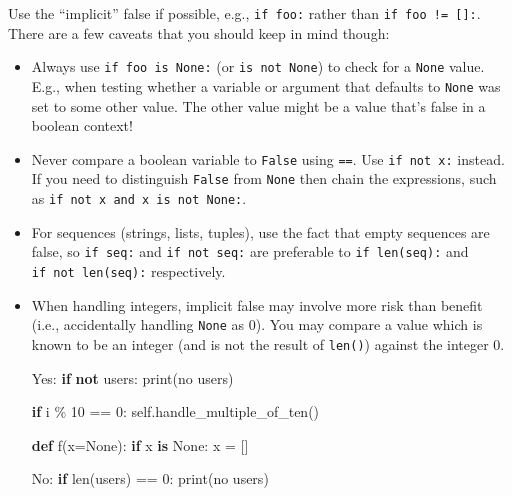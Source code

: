 \documentclass[
]{article}
\newenvironment{Shaded}{}{}
\newcommand{\BuiltInTok}[1]{\textcolor[rgb]{0.00,0.50,0.00}{#1}}
\newcommand{\ControlFlowTok}[1]{\textcolor[rgb]{0.00,0.44,0.13}{\textbf{#1}}}
\newcommand{\DecValTok}[1]{\textcolor[rgb]{0.25,0.63,0.44}{#1}}
\newcommand{\KeywordTok}[1]{\textcolor[rgb]{0.00,0.44,0.13}{\textbf{#1}}}
\newcommand{\NormalTok}[1]{#1}
\newcommand{\OperatorTok}[1]{\textcolor[rgb]{0.40,0.40,0.40}{#1}}
\newcommand{\StringTok}[1]{\textcolor[rgb]{0.25,0.44,0.63}{#1}}
\newcommand{\VariableTok}[1]{\textcolor[rgb]{0.10,0.09,0.49}{#1}}
\begin{document}
Use the ``implicit'' false if possible, e.g., \texttt{if\ foo:} rather
than \texttt{if\ foo\ !=\ {[}{]}:}. There are a few caveats that you
should keep in mind though:

\begin{itemize}
\item
  Always use \texttt{if\ foo\ is\ None:} (or \texttt{is\ not\ None}) to
  check for a \texttt{None} value. E.g., when testing whether a variable
  or argument that defaults to \texttt{None} was set to some other
  value. The other value might be a value that's false in a boolean
  context!
\item
  Never compare a boolean variable to \texttt{False} using \texttt{==}.
  Use \texttt{if\ not\ x:} instead. If you need to distinguish
  \texttt{False} from \texttt{None} then chain the expressions, such as
  \texttt{if\ not\ x\ and\ x\ is\ not\ None:}.
\item
  For sequences (strings, lists, tuples), use the fact that empty
  sequences are false, so \texttt{if\ seq:} and \texttt{if\ not\ seq:}
  are preferable to \texttt{if\ len(seq):} and
  \texttt{if\ not\ len(seq):} respectively.
\item
  When handling integers, implicit false may involve more risk than
  benefit (i.e., accidentally handling \texttt{None} as 0). You may
  compare a value which is known to be an integer (and is not the result
  of \texttt{len()}) against the integer 0.

\begin{samepage}
  \begin{Shaded}
\begin{Highlighting}[]
\NormalTok{Yes: }\ControlFlowTok{if} \KeywordTok{not}\NormalTok{ users:}
         \BuiltInTok{print}\NormalTok{(}\StringTok{\textquotesingle{}no users\textquotesingle{}}\NormalTok{)}

     \ControlFlowTok{if}\NormalTok{ i }\OperatorTok{\%} \DecValTok{10} \OperatorTok{==} \DecValTok{0}\NormalTok{:}
         \VariableTok{self}\NormalTok{.handle\_multiple\_of\_ten()}

     \KeywordTok{def}\NormalTok{ f(x}\OperatorTok{=}\VariableTok{None}\NormalTok{):}
         \ControlFlowTok{if}\NormalTok{ x }\KeywordTok{is} \VariableTok{None}\NormalTok{:}
\NormalTok{             x }\OperatorTok{=}\NormalTok{ []}
\end{Highlighting}
\end{Shaded}
\end{samepage}

\begin{samepage}
\begin{Shaded}
\begin{Highlighting}[]
\NormalTok{No:  }\ControlFlowTok{if} \BuiltInTok{len}\NormalTok{(users) }\OperatorTok{==} \DecValTok{0}\NormalTok{:}
         \BuiltInTok{print}\NormalTok{(}\StringTok{\textquotesingle{}no users\textquotesingle{}}\NormalTok{)}


\end{Highlighting}
\end{Shaded}
\end{samepage}
\end{itemize}
\end{document}
